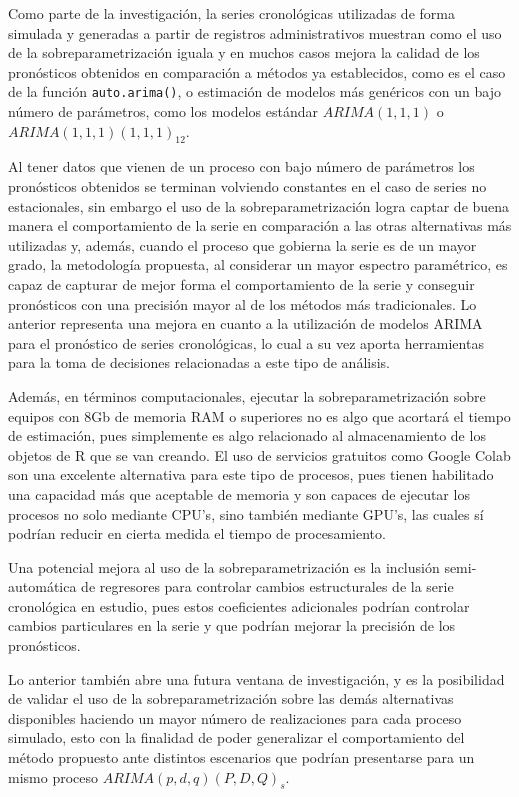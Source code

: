 \documentclass[
]{article}
\begin{document}
Como parte de la investigación, la series cronológicas utilizadas de
forma simulada y generadas a partir de registros administrativos
muestran como el uso de la sobreparametrización iguala y en muchos casos
mejora la calidad de los pronósticos obtenidos en comparación a métodos
ya establecidos, como es el caso de la función \texttt{auto.arima()}, o
estimación de modelos más genéricos con un bajo número de parámetros,
como los modelos estándar \(ARIMA(1,1,1)\) o
\(ARIMA(1,1,1)(1,1,1)_{12}\).

Al tener datos que vienen de un proceso con bajo número de parámetros
los pronósticos obtenidos se terminan volviendo constantes en el caso de
series no estacionales, sin embargo el uso de la sobreparametrización
logra captar de buena manera el comportamiento de la serie en
comparación a las otras alternativas más utilizadas y, además, cuando el
proceso que gobierna la serie es de un mayor grado, la metodología
propuesta, al considerar un mayor espectro paramétrico, es capaz de
capturar de mejor forma el comportamiento de la serie y conseguir
pronósticos con una precisión mayor al de los métodos más tradicionales.
Lo anterior representa una mejora en cuanto a la utilización de modelos
ARIMA para el pronóstico de series cronológicas, lo cual a su vez aporta
herramientas para la toma de decisiones relacionadas a este tipo de
análisis.

Además, en términos computacionales, ejecutar la sobreparametrización
sobre equipos con 8Gb de memoria RAM o superiores no es algo que
acortará el tiempo de estimación, pues simplemente es algo relacionado
al almacenamiento de los objetos de R que se van creando. El uso de
servicios gratuitos como Google Colab son una excelente alternativa para
este tipo de procesos, pues tienen habilitado una capacidad más que
aceptable de memoria y son capaces de ejecutar los procesos no solo
mediante CPU's, sino también mediante GPU's, las cuales sí podrían
reducir en cierta medida el tiempo de procesamiento.

Una potencial mejora al uso de la sobreparametrización es la inclusión
semi-automática de regresores para controlar cambios estructurales de la
serie cronológica en estudio, pues estos coeficientes adicionales
podrían controlar cambios particulares en la serie y que podrían mejorar
la precisión de los pronósticos.

Lo anterior también abre una futura ventana de investigación, y es la
posibilidad de validar el uso de la sobreparametrización sobre las demás
alternativas disponibles haciendo un mayor número de realizaciones para
cada proceso simulado, esto con la finalidad de poder generalizar el
comportamiento del método propuesto ante distintos escenarios que
podrían presentarse para un mismo proceso \(ARIMA(p,d,q)(P,D,Q)_s\).
\end{document}

